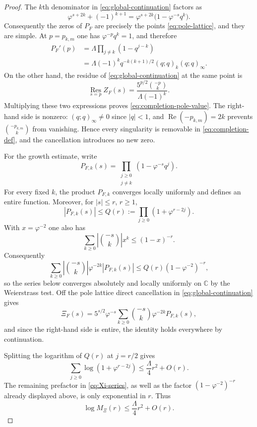 \documentclass[11pt]{article}
\theoremstyle{remark}
\newcommand{\ZF}{Z_F}
\newcommand{\Ree}{\operatorname{Re}}
\begin{document}
\begin{proof}
The $k$th denominator in \eqref{eq:global-continuation} factors as
\[
\varphi^{s+2k}+(-1)^{k+1}
=\varphi^{s+2k}\bigl(1-\varphi^{-s}q^k\bigr).
\]
Consequently the zeros of $P_F$ are precisely the points \eqref{eq:pole-lattice}, and they are simple.  At $p=p_{k,m}$ one has $\varphi^{-p}q^k=1$, and therefore
\begin{align*}
P_F'(p)
&=\Lambda\prod_{j\ne k}(1-q^{j-k})\\
&=\Lambda(-1)^kq^{-k(k+1)/2}(q;q)_k(q;q)_\infty.
\end{align*}
On the other hand, the residue of \eqref{eq:global-continuation} at the same point is
\[
\operatorname*{Res}_{s=p}\ZF(s)
=\frac{5^{p/2}\binom{-p}{k}}
{\Lambda(-1)^k}.
\]
Multiplying these two expressions proves \eqref{eq:completion-pole-value}.  The right-hand side is nonzero: $(q;q)_\infty\ne0$ since $|q|<1$, and $\Ree(-p_{k,m})=2k$ prevents $\binom{-p_{k,m}}{k}$ from vanishing.  Hence every singularity is removable in \eqref{eq:completion-def}, and the cancellation introduces no new zero.

For the growth estimate, write
\[
P_{F,k}(s)=\prod_{\substack{j\ge0\\j\ne k}}
(1-\varphi^{-s}q^j).
\]
For every fixed $k$, the product $P_{F,k}$ converges locally uniformly and defines an entire function.  Moreover, for $|s|\le r$, $r\ge1$,
\[
|P_{F,k}(s)|
\le Q(r):=\prod_{j\ge0}(1+\varphi^{r-2j}).
\]
With $x=\varphi^{-2}$ one also has
\[
\sum_{k\ge0}\left|\binom{-s}{k}\right|x^k
\le (1-x)^{-r}.
\]
Consequently
\[
\sum_{k\ge0}\left|\binom{-s}{k}\right|\varphi^{-2k}|P_{F,k}(s)|
\le Q(r)(1-\varphi^{-2})^{-r},
\]
so the series below converges absolutely and locally uniformly on $\mathbb C$ by the Weierstrass test.  Off the pole lattice direct cancellation in \eqref{eq:global-continuation} gives
\begin{equation}\label{eq:Xi-series}
\Xi_F(s)
=5^{s/2}\varphi^{-s}
\sum_{k\ge0}\binom{-s}{k}\varphi^{-2k}P_{F,k}(s),
\end{equation}
and since the right-hand side is entire, the identity holds everywhere by continuation.

Splitting the logarithm of $Q(r)$ at $j=r/2$ gives
\begin{equation}\label{eq:qproduct-growth}
\sum_{j\ge0}\log(1+\varphi^{r-2j})
\le \frac{\Lambda}{4}r^2+O(r).
\end{equation}
The remaining prefactor in \eqref{eq:Xi-series}, as well as the factor $(1-\varphi^{-2})^{-r}$ already displayed above, is only exponential in $r$.  Thus
\[
\log M_\Xi(r)\le \frac{\Lambda}{4}r^2+O(r).
\]


\end{proof}
\end{document}
